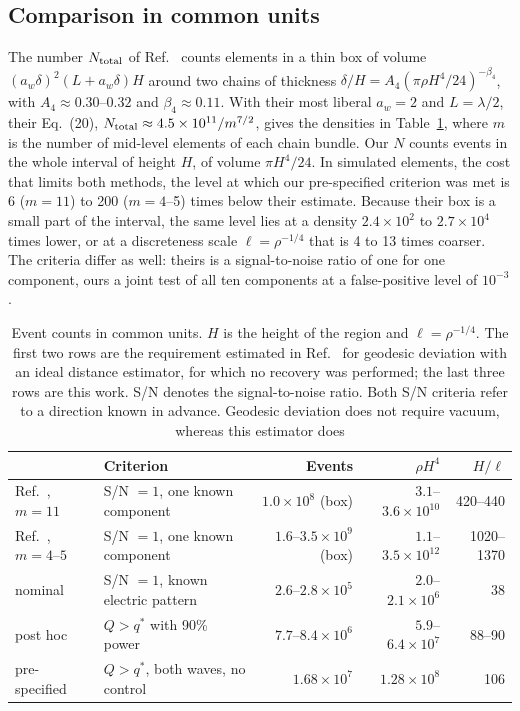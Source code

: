 \documentclass[11pt,a4paper]{article}
\begin{document}
\subsection{Comparison in common units}
The number $N_{\rm total}$ of Ref.~\cite{ib} counts elements in a thin box
of volume $(a_w\delta)^2(L+a_w\delta)H$ around two chains of thickness
$\delta/H=A_4(\pi\rho H^4/24)^{-\beta_4}$, with $A_4\approx0.30$--$0.32$ and
$\beta_4\approx0.11$. With their most liberal $a_w=2$ and $L=\lambda/2$,
their Eq.~(20), $N_{\rm total}\approx4.5\times10^{11}/m^{7/2}$, gives the
densities in Table~\ref{units}, where $m$ is the number of mid-level
elements of each chain bundle. Our $N$ counts events in the whole interval
of height $H$, of volume $\pi H^4/24$. In simulated elements, the cost that
limits both methods, the level at which our pre-specified criterion was met
is 6 ($m=11$) to 200 ($m=4$--5) times below their estimate. Because their box
is a small part of the interval, the same level lies at a density
$2.4\times10^2$ to $2.7\times10^4$ times lower, or at a discreteness scale
$\ell=\rho^{-1/4}$ that is 4 to 13 times coarser. The criteria differ as
well: theirs is a signal-to-noise ratio of one for one component, ours a
joint test of all ten components at a false-positive level of $10^{-3}$.

\begin{table}[t]
\centering\small
\caption{Event counts in common units. $H$ is the height of the region and
$\ell=\rho^{-1/4}$. The first two rows are the requirement estimated in
Ref.~\cite{ib} for geodesic deviation with an ideal distance estimator, for
which no recovery was performed; the last three rows are this work. S/N
denotes the signal-to-noise ratio. Both S/N criteria refer to a direction
known in advance. Geodesic deviation does not require vacuum, whereas this
estimator does}
\label{units}
\begin{tabular}{@{}llrrr@{}}
\toprule
 & Criterion & Events & $\rho H^4$ & $H/\ell$\\
\midrule
Ref.~\cite{ib}, $m=11$ & S/N $=1$, one known component & $1.0\times10^8$ (box) & $3.1$--$3.6\times10^{10}$ & 420--440\\
Ref.~\cite{ib}, $m=4$--$5$ & S/N $=1$, one known component & $1.6$--$3.5\times10^9$ (box) & $1.1$--$3.5\times10^{12}$ & 1020--1370\\
\midrule
nominal & S/N $=1$, known electric pattern & $2.6$--$2.8\times10^5$ & $2.0$--$2.1\times10^6$ & 38\\
post hoc & $Q>q^*$ with 90\% power & $7.7$--$8.4\times10^6$ & $5.9$--$6.4\times10^7$ & 88--90\\
pre-specified & $Q>q^*$, both waves, no control & $1.68\times10^7$ & $1.28\times10^8$ & 106\\
\bottomrule
\end{tabular}
\end{table}
\end{document}
